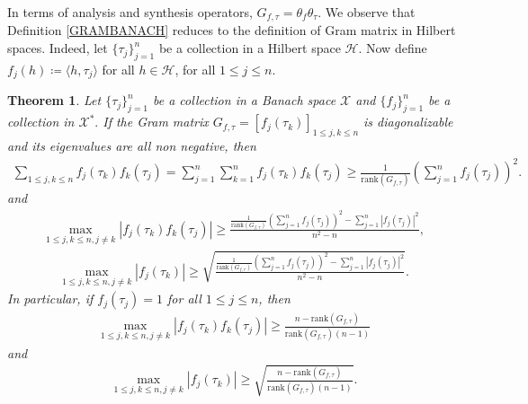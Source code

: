\documentclass{amsart}
\newtheorem{theorem}{Theorem}[section]
\begin{document}
In terms of analysis and synthesis operators, $G_{f,\tau}=\theta_f\theta_\tau$. We observe that Definition  \ref{GRAMBANACH}  reduces to the definition of Gram matrix in Hilbert spaces. Indeed, let $\{\tau_j\}_{j=1}^n$ be a collection in a  Hilbert space $\mathcal{H}$. Now define $f_j(h)\coloneqq \langle h, \tau_j\rangle $ for all $h \in \mathcal{H}$, for all $1\leq j \leq n$.
\begin{theorem}\label{GRAMFIRST}
Let $\{\tau_j\}_{j=1}^n$ be a collection in a  Banach space $\mathcal{X}$  and 	$\{f_j\}_{j=1}^n$ be a collection in  $\mathcal{X}^*.$  If the Gram matrix $G_{f,\tau}=[f_j(\tau_k)]_{1\leq j,k \leq n}$ is diagonalizable and its eigenvalues are all non negative, then 
\begin{align*}
\sum_{1\leq j,k \leq n }f_j(\tau_k)f_k(\tau_j)=\sum_{j=1}^n\sum_{k=1}^nf_j(\tau_k)f_k(\tau_j)\geq \frac{1}{\text{rank}(G_{f,\tau})}	\left(\sum_{j=1}^n
f_j(\tau_j)\right)^2.
\end{align*}
and 
\begin{align*}
\max _{1\leq j,k \leq n, j\neq k}|f_j(\tau_k)f_k(\tau_j)|\geq \frac{\frac{1}{\text{rank}(G_{f,\tau})}	\left(\sum_{j=1}^n
	f_j(\tau_j)\right)^2-	\sum_{j=1}^n
	|f_j(\tau_j)|^2}{n^2-n},
\end{align*}
\begin{align*}
\max _{1\leq j,k \leq n, j\neq k}|f_j(\tau_k)|\geq \sqrt{\frac{\frac{1}{\text{rank}(G_{f,\tau})}	\left(\sum_{j=1}^n
		f_j(\tau_j)\right)^2-	\sum_{j=1}^n
		|f_j(\tau_j)|^2}{n^2-n}}.
\end{align*}
In particular, if $f_j(\tau_j)=1$ for all $1\leq j \leq n$, then 
\begin{align*}
\max _{1\leq j,k \leq n, j\neq k}|f_j(\tau_k)f_k(\tau_j)|\geq \frac{n-\text{rank}(G_{f,\tau})}{\text{rank}(G_{f,\tau})(n-1)}
\end{align*}
and 
\begin{align*}
\max _{1\leq j,k \leq n, j\neq k}|f_j(\tau_k)|\geq \sqrt{\frac{n-\text{rank}(G_{f,\tau})}{\text{rank}(G_{f,\tau})(n-1)}}.
\end{align*}	
\end{theorem}
\end{document}
